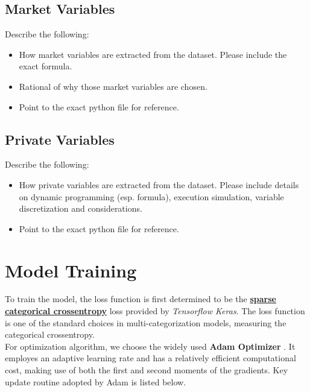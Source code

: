 \documentclass[12pt]{extarticle}
\begin{document}
\subsection{Market Variables} \label{market-variables}

Describe the following:
\begin{itemize}
  \item How market variables are extracted from the dataset. Please include the exact formula.
  \item Rational of why those market variables are chosen.
  \item Point to the exact python file for reference.
\end{itemize}

\subsection{Private Variables} \label{private-variables}

Describe the following:
\begin{itemize}
  \item How private variables are extracted from the dataset. Please include details on
  dynamic programming (esp. formula), execution simulation, variable discretization and considerations.
  \item Point to the exact python file for reference.
\end{itemize}

\section{Model Training}
To train the model, the loss function is first determined to be the
\href{https://github.com/tensorflow/tensorflow/blob/r1.13/tensorflow/python/keras/backend.py}{\textbf{sparse categorical crossentropy}}
loss provided by \textit{Tensorflow Keras}. The loss function is one of the standard
choices in multi-categorization models, measuring the categorical crossentropy. \\


\noindent For optimization algorithm, we choose the widely used \textbf{Adam Optimizer} \cite{adam}.
It employes an adaptive learning rate and has a relatively efficient computational cost,
making use of both the first and second moments of the gradients. Key update routine
adopted by Adam is listed below.
\end{document}
